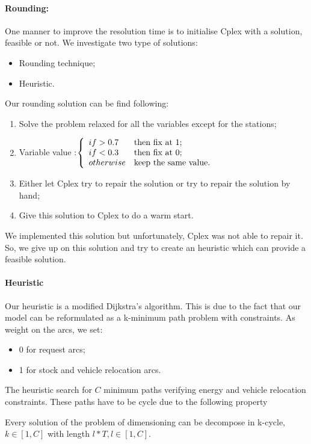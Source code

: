 \begin{bibunit}[ieeetr]
\paragraph{Rounding:}
One manner to improve the resolution time is to initialise Cplex with a solution, feasible or not.
We investigate two type of solutions:
\begin{itemize}
\item Rounding technique;
\item Heuristic.
\end{itemize}
Our rounding solution can be find following:

\begin{enumerate}
\item Solve the problem relaxed for all the variables except for the stations;
\item Variable value :$\left\{
\begin{array}{l l}
if > 0.7 & \text{then fix at 1;} \\
if < 0.3 & \text{then fix at 0;} \\
otherwise & \text{keep the same value.}
\end{array}
\right.$
\item Either let Cplex try to repair the solution or try to repair the solution by hand;
\item Give this solution to Cplex to do a warm start.
\end{enumerate}

We implemented this solution but unfortunately, Cplex was not able to repair it.
So, we give up on this solution and try to create an heuristic which can provide a feasible solution.

\paragraph{Heuristic}
Our heuristic is a modified Dijkstra's algorithm.
This is due to the fact that our model can be reformulated as a k-minimum path problem with constraints.
As weight on the arcs, we set: 
\begin{itemize}
\item 0 for request arcs;
\item 1 for stock and vehicle relocation arcs.
\end{itemize}
The heuristic search for $C$ minimum paths verifying energy and vehicle relocation constraints.
These paths have to be cycle due to the following property 
\begin{prop}
Every solution of the problem of dimensioning can be decompose in k-cycle, $k \in [1,C]$ with length $l*T, l\in [1,C]$.
\end{prop}


\end{bibunit}
